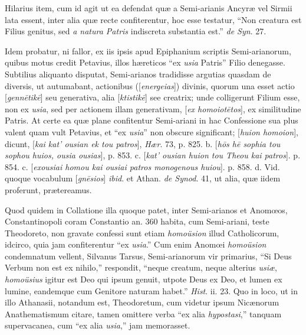 Hilarius
item, cum id agit ut ea defendat quæ a Semi-arianis Ancyræ vel
Sirmii lata essent, inter alia quæ recte confiterentur, hoc esse
testatur, ``Non creatura est Filius genitus, sed \emph{a natura Patris}
indiscreta substantia est.'' \emph{de Syn}. 27.

Idem
probatur, ni fallor, ex iis ipsis apud Epiphanium scriptis Semi-arianorum,
quibus motus credit Petavius, illos hæreticos ``ex \emph{usia} Patris''
Filio denegasse. Subtilius aliquanto disputat, Semi-arianos tradidisse
argutias quasdam de diversis, ut autumabant, actionibus ([\emph{energeias}])
divinis, quorum una esset actio [\emph{genn\={e}tik\={e}}] seu
generativa, alia [\emph{ktistik\={e}}] see creatrix; unde
colligerunt Filium esse, non ex \emph{usia}, sed per actionem illam
generativam, [\emph{ex homoiot\={e}tos}], ex similitudine Patris.
At certe ea quæ plane confitentur Semi-ariani in hac Confessione sua
plus valent quam vult Petavius, et ``ex \emph{usia}'' non obscure
significant; [\emph{huion homoion}], dicunt, [\emph{kai kat' ousian ek
tou patros}], \emph{Hær}. 73, p. 825. b. [\emph{h\={o}s h\={e}
sophia tou sophou huios, ousia ousias}], p. 853. c. [\emph{kat'
ousian huion tou Theou kai patros}]. p. 854. c. [\emph{exousiai homou
kai ousiai patros monogenous huiou}]. p. 858. d. Vid. quoque
vocabulum [\emph{gn\={e}sios}] \emph{ibid}. et Athan. \emph{de Synod}.
41, ut alia, quæ iidem proferunt, prætereamus.

Quod quidem
in Collatione illa quoque patet, inter Semi-arianos et Anomœos,
Constantinopoli coram Constantio an. 360 habita, cum Semi-ariani,
teste Theodoreto, non gravate confessi sunt etiam \emph{homoüsion}
illud Catholicorum, idcirco, quia jam confiterentur ``ex \emph{usia}.''
Cum enim Anomœi \emph{homoüsion} condemnatum vellent, Silvanus
Tarsus, Semi-arianorum vir primarius, ``Si Deus Verbum non est ex
nihilo,'' respondit, ``neque creatum, neque alterius \emph{usiæ}, \emph{homoüsius}
igitur est Deo qui ipsum genuit, utpote Deus ex Deo, et lumen ex
lumine, eandemque cum Genitore naturam habet.'' \emph{Hist}. ii. 23.
Quo in loco, ut in illo Athanasii, notandum est, Theodoretum, cum
videtur ipsum Nicænorum Anathematismum citare, tamen omittere verba ``ex alia \emph{hypostasi},'' tanquam supervacanea, cum ``ex alia \emph{usia},''
jam memorasset.

